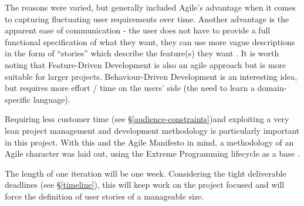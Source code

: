 \documentclass[11pt,fleqn,twoside]{article}
\begin{document}
The reasons were varied, but generally included Agile's advantage when it comes to capturing fluctuating user requirements over time. Another advantage is the apparent ease of communication - the user does not have to provide a full functional specification of what they want, they can use more vague descriptions in the form of ``stories'' which describe the feature(s) they want \cite{stories}. It is worth noting that Feature-Driven Development is also an agile approach but is more suitable for larger projects. Behaviour-Driven Development is an interesting idea, but requires more effort / time on the users' side (the need to learn a domain-specific language).

Requiring less customer time (see \S\ref{audience-constraints})and exploiting a very lean project management and development methodology is particularly important in this project. With this and the Agile Manifesto \cite{agile-manifesto} in mind, a methodology of an Agile character was laid out, using the Extreme Programming lifecycle as a base \cite{xp-lifecycle}. 

The length of one iteration will be one week. Considering the tight deliverable deadlines (see \S\ref{timeline}), this will keep work on the project focused and will force the definition of user stories of a manageable size.

\end{document}
